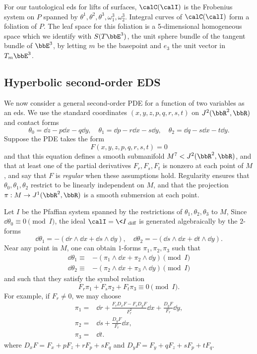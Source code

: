 \begin{example}
    For our tautological \gls{eds} for lifts of surfaces, $\calC(\calI)$ is the Frobenius system on $P$ spanned by $\theta^1,\theta^2,\theta^3,\omega^3_1,\omega^3_2$. Integral curves of $\calC(\calI)$ form a foliation of $P$. The leaf space for this foliation is a 5-dimensional homogeneous space which we identify with $S(T\bbE^3)$, the unit sphere bundle of the tangent bundle of $\bbE^3$, by letting $m$ be the basepoint and $e_3$ the unit vector in $T_m\bbE^3$.
\end{example}
















\subsection{Hyperbolic second-order EDS}\label{sec: hyperbolic EDS}


We now consider a general second-order PDE for a function of two variables as an \gls{eds}. We use the standard coordinates $(x,y,z,p,q,r,s,t)$ on $J^2(\bbR^2,\bbR)$ and contact forms 
\[\theta_0=\dd z-p \dd x-q\dd y,\quad \theta_1=\dd p-r\dd x-s\dd y,\quad \theta_2=\dd q-s\dd x-t\dd y.\]
Suppose the PDE takes the form 
\[F(x,y,z,p,q,r,s,t)=0\label{eq 7.10 Ivey}\]
and that this equation defines a smooth submanifold $M^7<J^2(\bbR^2,\bbR)$, and that at least one of the partial derivatives $F_r,F_s,F_t$ is nonzero at each point of $M$, and say that $F$ is \emph{regular} when these assumptions hold. Regularity ensures that $\theta_0,\theta_1,\theta_2$ restrict to be linearly independent on $M$, and that the projection $\pi:M\to J^1(\bbR^2,\bbR)$ is a smooth submersion at each point. 

Let $I$ be the Pfaffian system spanned by the restrictions of $\theta_1,\theta_2,\theta_3$ to $M$, Since $\dd\theta_0\equiv 0\pmod{I}$, the ideal $\calI=\<I\>_{\mathrm{diff}}$ is generated algebraically by the $2$-forms 
\[\dd\theta_1=-(\dd r\wedge \dd x+\dd s\wedge \dd y),\quad \dd\theta_2=-(\dd s\wedge\dd x+\dd t\wedge\dd y).\]
Near any point in $M$, one can obtain $1$-forms $\pi_1,\pi_2,\pi_3$ such that 
\begin{align}
    \dd\theta_1\equiv &-(\pi_1\wedge \dd x+\pi_2\wedge\dd y )\pmod{I} \\
    \dd\theta_2\equiv & -(\pi_2\wedge\dd x+\pi_3\wedge\dd y) \pmod{I}
\end{align}
and such that they satisfy the symbol relation 
\[F_r\pi_1+F_s\pi_2+F_t\pi_3\equiv 0\pmod{I}.\label{eq 6.15 Ivey}\]
For example, if $F_r\neq 0$, we may choose 
\begin{align}
    \pi_1=& \dd r+\frac{F_rD_xF-F_sD_yF}{F_r^2}\dd x+\frac{D_y F}{F_r}\dd y,\\
    \pi_2=&\dd s+\frac{D_y F}{F_r}\dd x,\\
    \pi_3=&\dd t.
\end{align}
where $D_xF=F_x+pF_z+rF_p+sF_q$ and $D_yF=F_y+qF_z+sF_p+tF_q$.

